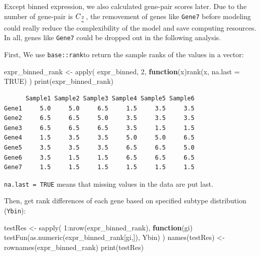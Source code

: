 \documentclass[
]{book}
\newenvironment{Shaded}{\begin{snugshade}}{\end{snugshade}}
\newcommand{\AttributeTok}[1]{\textcolor[rgb]{0.77,0.63,0.00}{#1}}
\newcommand{\ConstantTok}[1]{\textcolor[rgb]{0.00,0.00,0.00}{#1}}
\newcommand{\ControlFlowTok}[1]{\textcolor[rgb]{0.13,0.29,0.53}{\textbf{#1}}}
\newcommand{\DecValTok}[1]{\textcolor[rgb]{0.00,0.00,0.81}{#1}}
\newcommand{\FunctionTok}[1]{\textcolor[rgb]{0.00,0.00,0.00}{#1}}
\newcommand{\NormalTok}[1]{#1}
\newcommand{\OtherTok}[1]{\textcolor[rgb]{0.56,0.35,0.01}{#1}}
\newcommand{\SpecialCharTok}[1]{\textcolor[rgb]{0.00,0.00,0.00}{#1}}
\begin{document}
Except binned expression, we also calculated gene-pair scores later. Due to the number of gene-pair is \(C_{2 \atop n}\), the removement of genes like \texttt{Gene7} before modeling could really reduce the complexibility of the model and save computing resources. In all, genes like \texttt{Gene7} could be dropped out in the following analysis.

First, We use \texttt{base::rank}to return the sample ranks of the values in a vector:

\begin{Shaded}
\begin{Highlighting}[]
\NormalTok{expr\_binned\_rank }\OtherTok{\textless{}{-}} \FunctionTok{apply}\NormalTok{(}
\NormalTok{  expr\_binned, }
  \DecValTok{2}\NormalTok{, }
  \ControlFlowTok{function}\NormalTok{(x)}\FunctionTok{rank}\NormalTok{(x, }\AttributeTok{na.last =} \ConstantTok{TRUE}\NormalTok{)}
\NormalTok{)}
\FunctionTok{print}\NormalTok{(expr\_binned\_rank)}
\end{Highlighting}
\end{Shaded}

\begin{verbatim}
      Sample1 Sample2 Sample3 Sample4 Sample5 Sample6
Gene1     5.0     5.0     6.5     1.5     3.5     3.5
Gene2     6.5     6.5     5.0     3.5     3.5     3.5
Gene3     6.5     6.5     6.5     3.5     1.5     1.5
Gene4     1.5     3.5     3.5     5.0     5.0     6.5
Gene5     3.5     3.5     3.5     6.5     6.5     5.0
Gene6     3.5     1.5     1.5     6.5     6.5     6.5
Gene7     1.5     1.5     1.5     1.5     1.5     1.5
\end{verbatim}

\texttt{na.last\ =\ TRUE} means that missing values in the data are put last.

Then, get rank differences of each gene based on specified subtype distribution (\texttt{Ybin}):

\begin{Shaded}
\begin{Highlighting}[]
\NormalTok{testRes }\OtherTok{\textless{}{-}} \FunctionTok{sapply}\NormalTok{(}
  \DecValTok{1}\SpecialCharTok{:}\FunctionTok{nrow}\NormalTok{(expr\_binned\_rank), }
  \ControlFlowTok{function}\NormalTok{(gi) }\FunctionTok{testFun}\NormalTok{(}\FunctionTok{as.numeric}\NormalTok{(expr\_binned\_rank[gi,]), Ybin)}
\NormalTok{)}
\FunctionTok{names}\NormalTok{(testRes) }\OtherTok{\textless{}{-}} \FunctionTok{rownames}\NormalTok{(expr\_binned\_rank)}
\FunctionTok{print}\NormalTok{(testRes)}
\end{Highlighting}
\end{Shaded}
\end{document}
